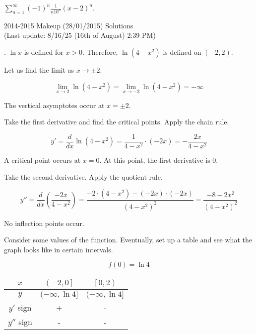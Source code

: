 \documentclass{article}
\begin{document}
\hfill

\noindent $\displaystyle\sum_{n=1}^\infty(-1)^n\frac1{n10^n}(x-2)^n$.

\newpage

\begin{center}
2014-2015 Makeup (28/01/2015) Solutions\\
(Last update: 8/16/25 (16th of August) 2:39 PM)
\end{center}

. $\ln x$ is defined for $x>0$. Therefore, $\ln\left(4-x^2\right)$ is defined on $(-2,2)$.

\hfill

\noindent Let us find the limit as $x\to\pm2$.

\begin{equation*}\lim_{x\to2}\ln\left(4-x^2\right)=\lim_{x\to-2}\ln\left(4-x^2\right)=-\infty\end{equation*}

\hfill

\noindent The vertical asymptotes occur at $x=\pm2$.

\hfill

\noindent Take the first derivative and find the critical points. Apply the chain rule.

\[y'=\frac d{dx}\ln\left(4-x^2\right)=\frac1{4-x^2}\cdot(-2x)=-\frac{2x}{4-x^2}\]

\hfill

\noindent A critical point occurs at $x=0$. At this point, the first derivative is $0$.

\hfill

\noindent Take the second derivative. Apply the quotient rule.

\[y''=\frac d{dx}\left(\frac{-2x}{4-x^2}\right)=\frac{-2\cdot(4-x^2)-(-2x)\cdot(-2x)}{\left(4-x^2\right)^2}=\frac{-8-2x^2}{\left(4-x^2\right)^2}\]

\hfill

\noindent No inflection points occur.

\hfill

\noindent Consider some values of the function. Eventually, set up a table and see what the graph looks like in certain intervals.

\begin{equation*}f(0)=\ln4\end{equation*}

\begin{center}
    \large
    \begin{tabular}{|c|cc|} 
    \hline
        $x$&$\left(-2,0\right]$&$\left[0,2\right)$\\
        \hline
        $y$&$(-\infty,\ln4]$&$(-\infty,\ln4]$\\
        \hline
        $y'$ sign&+&-\\
        \hline
        $y''$ sign&-&-\\
        \hline
    \end{tabular}
\end{center}
\end{document}
